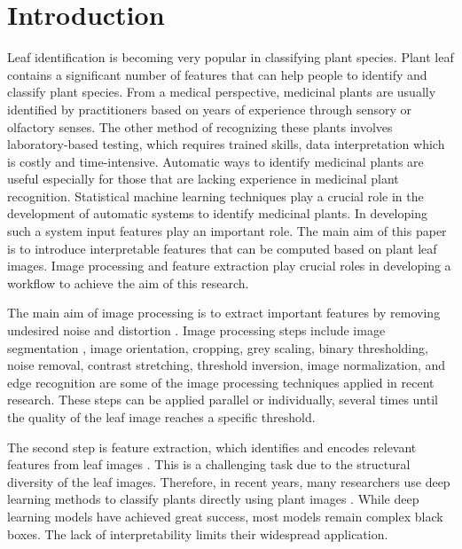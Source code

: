 \documentclass{article}
\begin{document}


\section{Introduction}

    Leaf identification is becoming very popular in classifying plant species. Plant leaf contains a significant number of features that can help people to identify and classify plant species. From a medical perspective, medicinal plants are usually identified by practitioners based on years of experience through sensory or olfactory senses. The other method of recognizing these plants involves laboratory-based testing, which requires trained skills, data interpretation which is costly and time-intensive. Automatic ways to identify medicinal plants are useful especially for those that are lacking experience in medicinal plant recognition. Statistical machine learning techniques play a crucial role in the development of automatic systems to identify medicinal plants. In developing such a system input features play an important role. The main aim of this paper is to introduce interpretable features that can be computed based on plant leaf images. Image processing and feature extraction play crucial roles in developing a workflow to achieve the aim of this research. 

  The main aim of image processing is to extract important features by removing undesired noise and distortion \citep{articlee}. Image processing steps include image segmentation \citep{DBLP}, image orientation, cropping, grey scaling, binary thresholding, noise removal, contrast stretching, threshold inversion, image normalization, and edge recognition are some of the image processing techniques applied in recent research. These steps can be applied parallel or individually, several times until the quality of the leaf image reaches a specific threshold. 

 The second step is feature extraction, which identifies and encodes relevant features from leaf images \citep{articlee}. This is a challenging task due to the structural diversity of the leaf images. Therefore, in recent years,  many researchers use deep learning methods to classify plants directly using plant images \citep{4458016,articlepl,inproceedings}. While deep learning models have achieved great success, most models remain complex black boxes.  The lack of interpretability limits their widespread application.
\end{document}
